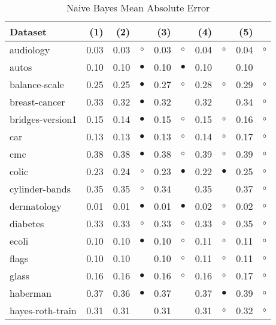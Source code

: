\newpage
{\centering \footnotesize \begin{longtable}{lrr@{\hspace{0.1cm}}cr@{\hspace{0.1cm}}cr@{\hspace{0.1cm}}cr@{\hspace{0.1cm}}c}
\caption{\label{nbmae}Naive Bayes Mean Absolute Error}
\\
\hline
Dataset & (1)& (2) & & (3) & & (4) & & (5) & \\
\hline
audiology & 0.03 & 0.03 &    $\circ$ & 0.03 &    $\circ$ & 0.04 &   $\circ$ & 0.04 &   $\circ$\\
autos & 0.10 & 0.10 &  $\bullet$ & 0.10 &  $\bullet$ & 0.10 &           & 0.10 &          \\
balance-scale & 0.25 & 0.25 &  $\bullet$ & 0.27 &    $\circ$ & 0.28 &   $\circ$ & 0.29 &   $\circ$\\
breast-cancer & 0.33 & 0.32 &  $\bullet$ & 0.32 &            & 0.32 &           & 0.34 &   $\circ$\\
bridges-version1 & 0.15 & 0.14 &  $\bullet$ & 0.15 &    $\circ$ & 0.15 &   $\circ$ & 0.16 &   $\circ$\\
car & 0.13 & 0.13 &  $\bullet$ & 0.13 &    $\circ$ & 0.14 &   $\circ$ & 0.17 &   $\circ$\\
cmc & 0.38 & 0.38 &  $\bullet$ & 0.38 &    $\circ$ & 0.39 &   $\circ$ & 0.39 &   $\circ$\\
colic & 0.23 & 0.24 &    $\circ$ & 0.23 &  $\bullet$ & 0.22 & $\bullet$ & 0.25 &   $\circ$\\
cylinder-bands & 0.35 & 0.35 &    $\circ$ & 0.34 &            & 0.35 &           & 0.37 &   $\circ$\\
dermatology & 0.01 & 0.01 &  $\bullet$ & 0.01 &  $\bullet$ & 0.02 &   $\circ$ & 0.02 &   $\circ$\\
diabetes & 0.33 & 0.33 &    $\circ$ & 0.33 &    $\circ$ & 0.33 &   $\circ$ & 0.35 &   $\circ$\\
ecoli & 0.10 & 0.10 &  $\bullet$ & 0.10 &    $\circ$ & 0.11 &   $\circ$ & 0.11 &   $\circ$\\
flags & 0.10 & 0.10 &            & 0.10 &    $\circ$ & 0.11 &   $\circ$ & 0.11 &   $\circ$\\
glass & 0.16 & 0.16 &  $\bullet$ & 0.16 &    $\circ$ & 0.16 &   $\circ$ & 0.17 &   $\circ$\\
haberman & 0.37 & 0.36 &  $\bullet$ & 0.37 &            & 0.37 & $\bullet$ & 0.39 &   $\circ$\\
hayes-roth-train & 0.31 & 0.31 &            & 0.31 &            & 0.31 &   $\circ$ & 0.32 &   $\circ$\\

\end{longtable}}
